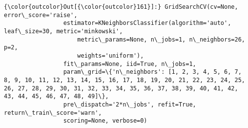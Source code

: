 \documentclass[11pt]{article}
\begin{document}
\begin{Verbatim}[commandchars=\\\{\}]
{\color{outcolor}Out[{\color{outcolor}161}]:} GridSearchCV(cv=None, error\_score='raise',
                 estimator=KNeighborsClassifier(algorithm='auto', leaf\_size=30, metric='minkowski',
                     metric\_params=None, n\_jobs=1, n\_neighbors=26, p=2,
                     weights='uniform'),
                 fit\_params=None, iid=True, n\_jobs=1,
                 param\_grid=\{'n\_neighbors': [1, 2, 3, 4, 5, 6, 7, 8, 9, 10, 11, 12, 13, 14, 15, 16, 17, 18, 19, 20, 21, 22, 23, 24, 25, 26, 27, 28, 29, 30, 31, 32, 33, 34, 35, 36, 37, 38, 39, 40, 41, 42, 43, 44, 45, 46, 47, 48, 49]\},
                 pre\_dispatch='2*n\_jobs', refit=True, return\_train\_score='warn',
                 scoring=None, verbose=0)
\end{Verbatim}
            

    
    
    
    
\end{document}
